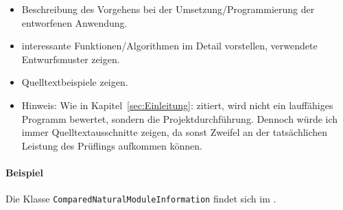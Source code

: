 \begin{itemize}
	\item Beschreibung des Vorgehens bei der Umsetzung/Programmierung der entworfenen Anwendung.
	\item \Ggfs interessante Funktionen/Algorithmen im Detail vorstellen, verwendete Entwurfsmuster zeigen.
	\item Quelltextbeispiele zeigen.
	\item Hinweis: Wie in Kapitel~\ref{sec:Einleitung}:  zitiert, wird nicht ein lauffähiges Programm bewertet, sondern die Projektdurchführung. Dennoch würde ich immer Quelltextausschnitte zeigen, da sonst Zweifel an der tatsächlichen Leistung des Prüflings aufkommen können.
\end{itemize}

\paragraph{Beispiel}
Die Klasse \texttt{Com\-par\-ed\-Na\-tu\-ral\-Mo\-dule\-In\-for\-ma\-tion} findet sich im .  
